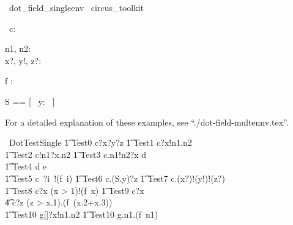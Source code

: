 \begin{zsection}
  \SECTION\ dot\_field\_singleenv \parents\ circus\_toolkit
\end{zsection}
\begin{circus}
   \circchannel\ c: \nat \cross \nat \cross \nat \cross \nat
\end{circus}

\begin{axdef}
   n1, n2: \nat \\
   x?, y!, z?: \nat
\end{axdef}

\begin{axdef}
   f : \nat \fun \nat \cross \nat
\end{axdef}

\begin{zed}
   S == [~ y: \nat ~]
\end{zed}

For a detailed explanation of these examples, see ``./dot-field-multennv.tex''.
%
\begin{circus}
  \circprocess\ DotTestSingle \circdef \circbegin
  \also %
   \t1 Test0 \circdef c?x?y?z \then \Skip
   \also
   \t1 Test1 \circdef c?x!n1.n2 \then \Skip \\
   \t1 Test2 \circdef c!n1?x.n2 \then \Skip
   \also
   \t1 Test3 \circdef c.n1!n2?x \then d \Skip \\
   \t1 Test4 \circdef d \then e \then \Skip \\
   \t1 Test5 \circdef c~?i~!(f~i) \then \Skip
       \also
   \t1 Test6 \circdef c.(S.y)?z \then \Skip
       \also
   \t1 Test7 \circdef c.(x?)!(y!)!(z?) \then \Skip \\
   \t1 Test8 \circdef c?x \prefixcolon (x > 1)!(f~x) \then \Skip
    \also
   \t1 Test9 \circdef c?x \then \\
                  \t4 c?z \prefixcolon (z > x.1).(f~(x.2+x.3)) \then \Skip \\
   \t1 Test10 \circdef g[\nat \cross \nat \cross \nat]?x!n1.n2 \then \Skip
        \also
   \t1 Test10 \circdef g.n1.(f~n1) \then \Skip \\   
   \circspot \Skip \\
   \circend
\end{circus}


